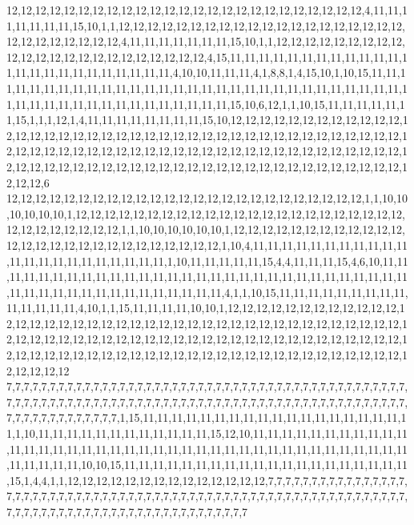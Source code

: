 12,12,12,12,12,12,12,12,12,12,12,12,12,12,12,12,12,12,12,12,12,12,12,12,12,4,11,11,11,11,11,11,11,15,10,1,1,12,12,12,12,12,12,12,12,12,12,12,12,12,12,12,12,12,12,12,12,12,12,12,12,12,12,12,12,4,11,11,11,11,11,11,11,15,10,1,1,12,12,12,12,12,12,12,12,12,12,12,12,12,12,12,12,12,12,12,12,12,12,12,4,15,11,11,11,11,11,11,11,11,11,11,11,11,11,11,11,11,11,11,11,11,11,11,11,11,4,10,10,11,11,11,4,1,8,8,1,4,15,10,1,10,15,11,11,11,11,11,11,11,11,11,11,11,11,11,11,11,11,11,11,11,11,11,11,11,11,11,11,11,11,11,11,11,11,11,11,11,11,11,11,11,11,11,11,11,11,11,11,15,10,6,12,1,1,10,15,11,11,11,11,11,11,15,1,1,1,12,1,4,11,11,11,11,11,11,11,11,15,10,12,12,12,12,12,12,12,12,12,12,12,12,12,12,12,12,12,12,12,12,12,12,12,12,12,12,12,12,12,12,12,12,12,12,12,12,12,12,12,12,12,12,12,12,12,12,12,12,12,12,12,12,12,12,12,12,12,12,12,12,12,12,12,12,12,12,12,12,12,12,12,12,12,12,12,12,12,12,12,12,12,12,12,12,12,12,12,12,12,12,12,12,12,12,12,12,12,12,12,6
12,12,12,12,12,12,12,12,12,12,12,12,12,12,12,12,12,12,12,12,12,12,12,12,12,1,1,10,10,10,10,10,10,1,12,12,12,12,12,12,12,12,12,12,12,12,12,12,12,12,12,12,12,12,12,12,12,12,12,12,12,12,12,12,12,1,1,10,10,10,10,10,10,1,12,12,12,12,12,12,12,12,12,12,12,12,12,12,12,12,12,12,12,12,12,12,12,12,12,12,12,1,10,4,11,11,11,11,11,11,11,11,11,11,11,11,11,11,11,11,11,11,11,11,11,11,1,10,11,11,11,11,11,15,4,4,11,11,11,15,4,6,10,11,11,11,11,11,11,11,11,11,11,11,11,11,11,11,11,11,11,11,11,11,11,11,11,11,11,11,11,11,11,11,11,11,11,11,11,11,11,11,11,11,11,11,11,11,4,1,1,10,15,11,11,11,11,11,11,11,11,11,11,11,11,11,11,4,10,1,1,15,11,11,11,11,10,10,1,12,12,12,12,12,12,12,12,12,12,12,12,12,12,12,12,12,12,12,12,12,12,12,12,12,12,12,12,12,12,12,12,12,12,12,12,12,12,12,12,12,12,12,12,12,12,12,12,12,12,12,12,12,12,12,12,12,12,12,12,12,12,12,12,12,12,12,12,12,12,12,12,12,12,12,12,12,12,12,12,12,12,12,12,12,12,12,12,12,12,12,12,12,12,12,12,12,12,12,12,12
7,7,7,7,7,7,7,7,7,7,7,7,7,7,7,7,7,7,7,7,7,7,7,7,7,7,7,7,7,7,7,7,7,7,7,7,7,7,7,7,7,7,7,7,7,7,7,7,7,7,7,7,7,7,7,7,7,7,7,7,7,7,7,7,7,7,7,7,7,7,7,7,7,7,7,7,7,7,7,7,7,7,7,7,7,7,7,7,7,7,7,7,7,7,7,7,7,7,7,7,7,7,7,7,7,1,15,11,11,11,11,11,11,11,11,11,11,11,11,11,11,11,11,11,11,11,1,10,11,11,11,11,11,11,11,11,11,11,11,11,15,12,10,11,11,11,11,11,11,11,11,11,11,11,11,11,11,11,11,11,11,11,11,11,11,11,11,11,11,11,11,11,11,11,11,11,11,11,11,11,11,11,11,11,11,11,11,10,10,15,11,11,11,11,11,11,11,11,11,11,11,11,11,11,11,11,11,11,11,11,15,1,4,4,1,1,12,12,12,12,12,12,12,12,12,12,12,12,12,12,7,7,7,7,7,7,7,7,7,7,7,7,7,7,7,7,7,7,7,7,7,7,7,7,7,7,7,7,7,7,7,7,7,7,7,7,7,7,7,7,7,7,7,7,7,7,7,7,7,7,7,7,7,7,7,7,7,7,7,7,7,7,7,7,7,7,7,7,7,7,7,7,7,7,7,7,7,7,7,7,7,7,7,7,7,7,7,7,7,7
